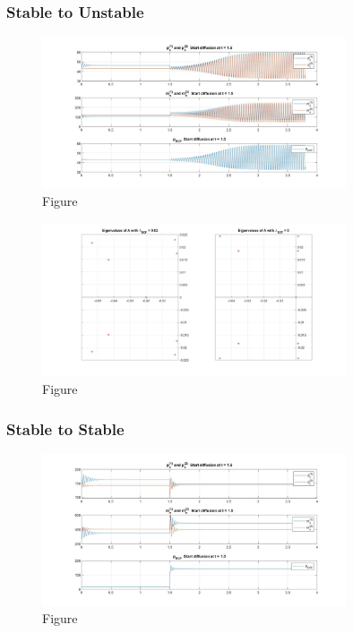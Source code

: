 \documentclass[12pt]{article}
\renewcommand{\(}{\left (}
\renewcommand{\)}{\right )}
\begin{document}
\subsubsection{Stable to Unstable}

\begin{figure}[ht]
    \centering
	\begin{minipage}{0.99\textwidth}
		\centering
		\includegraphics[width=0.8\textwidth]{SU.jpg}
		\caption*{\small Figure}
	\end{minipage}
\end{figure}

\begin{figure}[ht]
    \centering
	\begin{minipage}{0.99\textwidth}
		\centering
		\includegraphics[width=0.8\textwidth]{SUEi.jpg}
		\caption*{\small Figure}
	\end{minipage}
\end{figure}

\subsubsection{Stable to Stable}

\begin{figure}[ht]
    \centering
	\begin{minipage}{0.99\textwidth}
		\centering
		\includegraphics[width=0.8\textwidth]{SS.jpg}
		\caption*{\small Figure}
	\end{minipage}
\end{figure}
\end{document}
